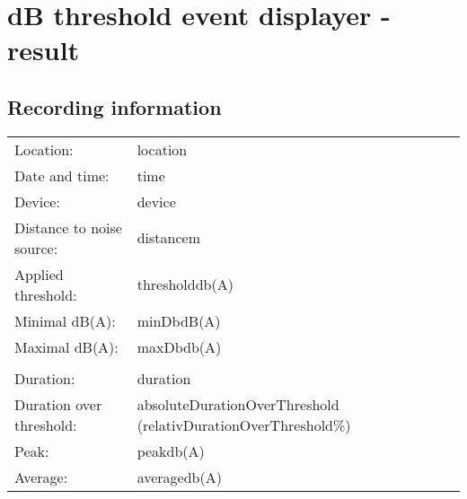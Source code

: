 \documentclass{article}
\begin{document}
\thispagestyle{empty}

\section*{dB threshold event displayer - result}

\subsection*{Recording information}

\begin{table}[h!]
    \begin{tabular}{p{4cm} p{4cm}}
        Location:                   & {{location}}      \\
        Date and time:              & {{time}}          \\
        Device:                     & {{device}}        \\
        Distance to noise source:   & {{distance}}m      \\
        Applied threshold:          & {{threshold}}db(A)     \\
        Minimal dB(A):              & {{minDb}}dB(A)    \\
        Maximal dB(A):              & {{maxDb}}db(A)    \\
                                                        \\
        Duration:                   & {{duration}}      \\
        Duration over threshold:    & {{absoluteDurationOverThreshold}} ({{relativDurationOverThreshold}}\%) \\
        Peak:                       & {{peak}}db(A)  \\
        Average:                    & {{average}}db(A)  \\
    \end{tabular}
    \label{tab:table}
\end{table}

\begin{figure}[h!]
    \begin{center}
    \end{center}
    \label{fig:filtered-audio-values}
\end{figure}
\end{document}
